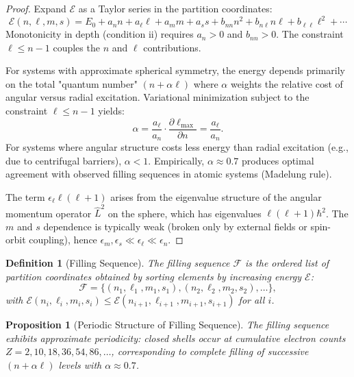 \documentclass[twocolumn,10pt,a4paper]{article}
\newtheorem{proposition}[theorem]{Proposition}
\newtheorem{definition}[theorem]{Definition}
\theoremstyle{remark}
\begin{document}
\begin{proof}
Expand $\mathcal{E}$ as a Taylor series in the partition coordinates:
\begin{equation}
\mathcal{E}(n, \ell, m, s) = E_0 + a_n n + a_\ell \ell + a_m m + a_s s + b_{nn} n^2 + b_{n\ell} n\ell + b_{\ell\ell} \ell^2 + \cdots
\end{equation}
Monotonicity in depth (condition ii) requires $a_n > 0$ and $b_{nn} > 0$. The constraint $\ell \leq n - 1$ couples the $n$ and $\ell$ contributions. 

For systems with approximate spherical symmetry, the energy depends primarily on the total "quantum number" $(n + \alpha \ell)$ where $\alpha$ weights the relative cost of angular versus radial excitation. Variational minimization subject to the constraint $\ell \leq n - 1$ yields:
\begin{equation}
\alpha = \frac{a_\ell}{a_n} \cdot \frac{\partial \ell_{\max}}{\partial n} = \frac{a_\ell}{a_n}.
\end{equation}
For systems where angular structure costs less energy than radial excitation (e.g., due to centrifugal barriers), $\alpha < 1$. Empirically, $\alpha \approx 0.7$ produces optimal agreement with observed filling sequences in atomic systems (Madelung rule).

The term $\epsilon_\ell \ell(\ell + 1)$ arises from the eigenvalue structure of the angular momentum operator $\hat{L}^2$ on the sphere, which has eigenvalues $\ell(\ell + 1)\hbar^2$. The $m$ and $s$ dependence is typically weak (broken only by external fields or spin-orbit coupling), hence $\epsilon_m, \epsilon_s \ll \epsilon_\ell \ll \epsilon_n$.
\end{proof}

\begin{definition}[Filling Sequence]
\label{def:filling}
The \emph{filling sequence} $\mathcal{F}$ is the ordered list of partition coordinates obtained by sorting elements by increasing energy $\mathcal{E}$:
\begin{equation}
\mathcal{F} = \{(n_1, \ell_1, m_1, s_1), (n_2, \ell_2, m_2, s_2), \ldots\},
\end{equation}
with $\mathcal{E}(n_i, \ell_i, m_i, s_i) \leq \mathcal{E}(n_{i+1}, \ell_{i+1}, m_{i+1}, s_{i+1})$ for all $i$.
\end{definition}

\begin{proposition}[Periodic Structure of Filling Sequence]
\label{prop:periodic_structure}
The filling sequence exhibits approximate periodicity: \emph{closed shells} occur at cumulative electron counts $Z = 2, 10, 18, 36, 54, 86, \ldots$, corresponding to complete filling of successive $(n + \alpha \ell)$ levels with $\alpha \approx 0.7$.
\end{proposition}
\end{document}
